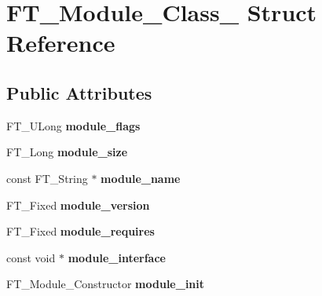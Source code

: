 \hypertarget{struct_f_t___module___class__}{\section{F\-T\-\_\-\-Module\-\_\-\-Class\-\_\- Struct Reference}
\label{struct_f_t___module___class__}
}
\subsection*{Public Attributes}
\begin{DoxyCompactItemize}
\item 
\hypertarget{struct_f_t___module___class___a54a02a3767955cd8fa0cd786bd1f9515}{F\-T\-\_\-\-U\-Long {\bfseries module\-\_\-flags}}\label{struct_f_t___module___class___a54a02a3767955cd8fa0cd786bd1f9515}

\item 
\hypertarget{struct_f_t___module___class___a2582eeab364e4fbbd5d1e420bfcf3207}{F\-T\-\_\-\-Long {\bfseries module\-\_\-size}}\label{struct_f_t___module___class___a2582eeab364e4fbbd5d1e420bfcf3207}

\item 
\hypertarget{struct_f_t___module___class___af25b9e32b6c91e0c31560efb62886ed7}{const F\-T\-\_\-\-String $\ast$ {\bfseries module\-\_\-name}}\label{struct_f_t___module___class___af25b9e32b6c91e0c31560efb62886ed7}

\item 
\hypertarget{struct_f_t___module___class___a5b649f1965c42fd8c54bbc370fbf60b4}{F\-T\-\_\-\-Fixed {\bfseries module\-\_\-version}}\label{struct_f_t___module___class___a5b649f1965c42fd8c54bbc370fbf60b4}

\item 
\hypertarget{struct_f_t___module___class___a24772981bd972d342f54a6e1704f85c3}{F\-T\-\_\-\-Fixed {\bfseries module\-\_\-requires}}\label{struct_f_t___module___class___a24772981bd972d342f54a6e1704f85c3}

\item 
\hypertarget{struct_f_t___module___class___a320168f227e2d268691429ac0c6b2900}{const void $\ast$ {\bfseries module\-\_\-interface}}\label{struct_f_t___module___class___a320168f227e2d268691429ac0c6b2900}

\item 
\hypertarget{struct_f_t___module___class___a60f2bb9eee68366f20fe0613f347ffbd}{F\-T\-\_\-\-Module\-\_\-\-Constructor {\bfseries module\-\_\-init}}\label{struct_f_t___module___class___a60f2bb9eee68366f20fe0613f347ffbd}


\end{DoxyCompactItemize}
